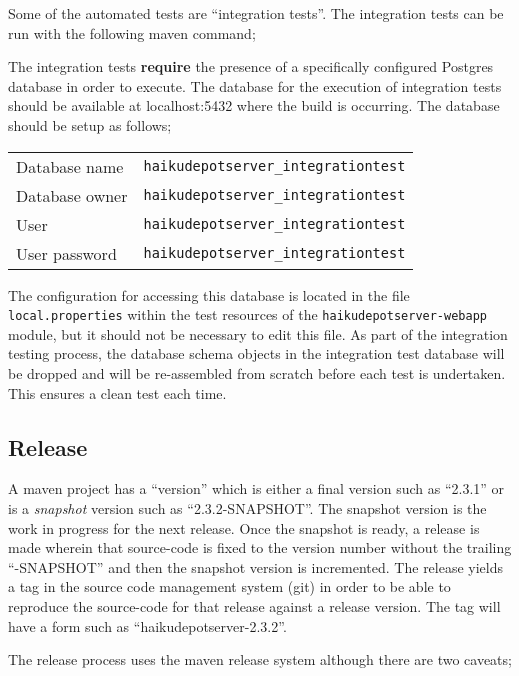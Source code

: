 Some of the automated tests are ``integration tests''.  The integration tests can be run with the following maven command;


The integration tests {\bf require} the presence of a specifically configured Postgres database in order to execute.  The database for the execution of integration tests should be available at localhost:5432 where the build is occurring.  The database should be setup as follows;

\begin{tabular}{ | l | l | }
  \hline
  Database name & {\tt haikudepotserver\_integrationtest} \\
  Database owner & {\tt haikudepotserver\_integrationtest} \\
  User & {\tt haikudepotserver\_integrationtest} \\
  User password & {\tt haikudepotserver\_integrationtest} \\
  \hline
\end{tabular}

The configuration for accessing this database is located in the file {\tt local.properties} within the test resources of the {\tt haikudepotserver-webapp} module, but it should not be necessary to edit this file.  As part of the integration testing process, the database schema objects in the integration test database will be dropped and will be re-assembled from scratch before each test is undertaken.  This ensures a clean test each time.

\subsection{Release}

A maven project has a ``version'' which is either a final version such as ``2.3.1'' or is a {\it snapshot} version such as ``2.3.2-SNAPSHOT''.  The snapshot version is the work in progress for the next release.  Once the snapshot is ready, a release is made wherein that source-code is fixed to the version number without the trailing ``-SNAPSHOT'' and then the snapshot version is incremented.  The release yields a tag in the source code management system (git) in order to be able to reproduce the source-code for that release against a release version.  The tag will have a form such as ``haikudepotserver-2.3.2''.

The release process uses the maven release system although there are two caveats;

